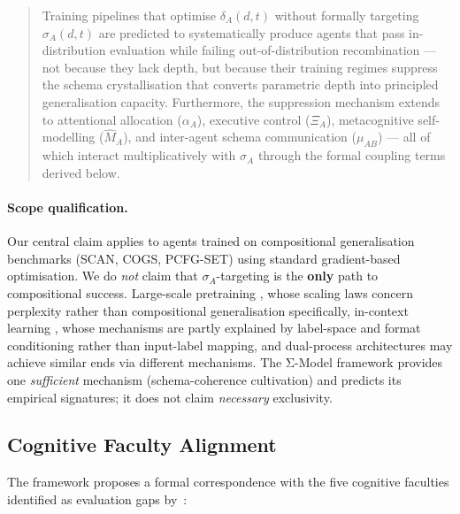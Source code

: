 \documentclass[11pt,a4paper]{article}
\begin{document}
\begin{quote}
Training pipelines that optimise $\delta_A(d,t)$ without formally
targeting $\sigma_A(d,t)$ are predicted to systematically produce
agents that pass in-distribution evaluation while failing
out-of-distribution recombination --- not because they lack depth,
but because their training regimes suppress the schema crystallisation
that converts parametric depth into principled generalisation capacity.
Furthermore, the suppression mechanism extends to attentional allocation
($\alpha_A$), executive control ($\Xi_A$), metacognitive self-modelling
($\hat{M}_A$), and inter-agent schema communication ($\mu_{AB}$) ---
all of which interact multiplicatively with $\sigma_A$ through the
formal coupling terms derived below.
\end{quote}

\paragraph{Scope qualification.}
Our central claim applies to agents trained on compositional
generalisation benchmarks (SCAN, COGS, PCFG-SET) using standard
gradient-based optimisation. We do \emph{not} claim that
$\sigma_A$-targeting is the \textbf{only} path to compositional
success. Large-scale pretraining \citep{kaplan2020scaling}, whose scaling laws concern perplexity rather than compositional generalisation specifically,
in-context learning \citep{min2022rethinking}, whose mechanisms are partly explained by label-space and format conditioning rather than input-label mapping, and dual-process
architectures \citep{noviello2025neuroscienceinspiredualprocess} may achieve similar ends via
different mechanisms. The Σ-Model framework provides one
\emph{sufficient} mechanism (schema-coherence cultivation) and
predicts its empirical signatures; it does not claim \emph{necessary}
exclusivity.

\subsection{Cognitive Faculty Alignment}\label{sec:cognitive-faculty-alignment}

The framework proposes a formal correspondence with the five cognitive
faculties identified as evaluation gaps by~\cite{burnell2026measuringprogressagi}:
\end{document}
